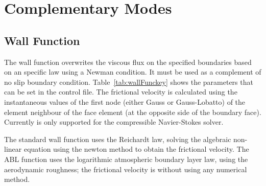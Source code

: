 \documentclass[a4paper,10pt]{report}
\begin{document}
\section{Complementary Modes}

\subsection{Wall Function}

The wall function overwrites the viscous flux on the specified boundaries based on an specific law using a Newman condition. It must be used as a complement of no slip boundary condition. Table~\ref{tab:wallFunckey} shows the parameters that can be set in the control file. The frictional velocity is calculated using the instantaneous values of the first node (either Gauss or Gauss-Lobatto) of the element neighbour of the face element (at the opposite side of the boundary face). Currently is only supported for the compressible Navier-Stokes solver.

The standard wall function uses the Reichardt law, solving the algebraic non-linear equation using the newton method to obtain the frictional velocity. The ABL function uses the logarithmic atmospheric boundary layer law, using the aerodynamic roughness; the frictional velocity is without using any numerical method.
\end{document}
